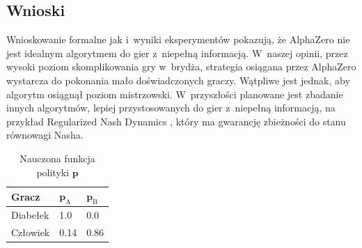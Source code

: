 \subsection*{Wnioski}

Wnioskowanie formalne jak i~wyniki eksperymentów pokazują,
że AlphaZero nie jest idealnym algorytmem do gier z~niepełną informacją.
W~naszej opinii, przez wysoki poziom skomplikowania gry w~brydża,
strategia osiągana przez AlphaZero wystarcza do pokonania mało doświadczonych graczy.
Wątpliwe jest jednak, aby algorytm osiągnął poziom mistrzowski.
W~przyszłości planowane jest zbadanie innych algorytmów,
lepiej przystosowanych do gier z~niepełną informacją,
na przykład Regularized Nash Dynamics \cite{doi:10.1126/science.add4679},
który ma gwarancję zbieżności do stanu równowagi Nasha.


\begin{table}
    \centering
    \caption{Nauczona funkcja polityki $\mathbf{p}$}
    \label{tab:devil-game-policy}
    \begin{tabular}{lll}
        \toprule
        Gracz & $\mathbf{p}_\mathrm{A}$ & $\mathbf{p}_\mathrm{B}$ \\ \midrule
        Diabełek & 1.0 & 0.0 \\
        Człowiek & 0.14 & 0.86 \\
        \bottomrule
    \end{tabular}
\end{table}



